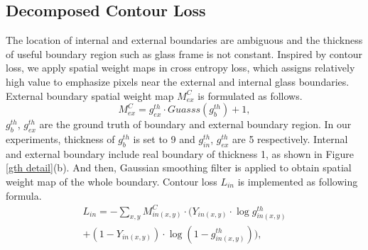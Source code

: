 \documentclass[10pt,twocolumn,letterpaper]{article}
\begin{document}
\subsection{Decomposed Contour Loss}
The location of internal and external boundaries are ambiguous and the thickness of useful boundary region such as glass frame is not constant.
Inspired by contour loss\cite{chen2020contour}, we apply spatial weight maps in cross entropy loss, which assigns relatively high value to emphasize pixels near the external and internal glass boundaries. External boundary spatial weight map ${\textit{M}}^{C}_{ex}$ is formulated as follows.
\begin{equation}
\label{eqn:11}
{\textit{M}}^{C}_{ex}={\textit{g}}^{th}_{ex}\cdot{Guasss}({\textit{g}}^{th}_{b})+1,
\end{equation}
${\textit{g}}^{th}_{b}$, ${\textit{g}}^{th}_{ex}$ are the ground truth of boundary and external boundary region. In our experiments, thickness of ${\textit{g}}^{th}_{b}$ is set to 9 and ${\textit{g}}^{th}_{in}$, ${\textit{g}}^{th}_{ex}$ are 5 respectively. Internal and external boundary include real boundary of thickness 1, as shown in Figure \ref{gth detail}(b). And then, Gaussian smoothing filter is applied to obtain spatial weight map of the whole boundary.
Contour loss ${\textit{L}}_{in}$ is implemented as following formula.
\begin{multline}
\label{eqn:05}
{\textit{L}}_{in}=-\sum_{x,y}{\textit{M}}^{C}_{in(x,y)}\cdot({\textit{Y}}_{in(x,y)}\cdot{\log{\textit{g}}^{th}_{in(x,y)}}\\
+(1-{\textit{Y}}_{in(x,y)})\cdot\log{(1-{\textit{g}}^{th}_{in(x,y)})}),
\end{multline}
\end{document}
